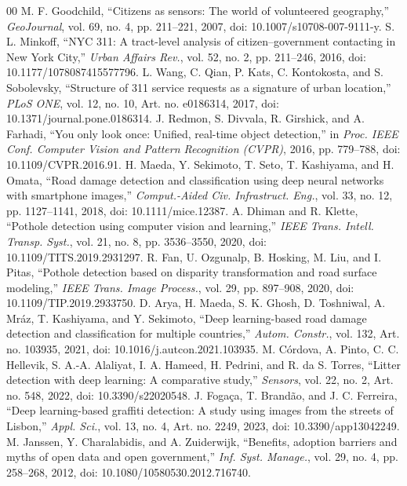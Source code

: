 \documentclass{ieeeaccess}
\begin{document}
\begin{thebibliography}{00}
 M. F. Goodchild, ``Citizens as sensors: The world of volunteered geography,'' \textit{GeoJournal}, vol. 69, no. 4, pp. 211--221, 2007, doi: 10.1007/s10708-007-9111-y.
 S. L. Minkoff, ``NYC 311: A tract-level analysis of citizen--government contacting in New York City,'' \textit{Urban Affairs Rev.}, vol. 52, no. 2, pp. 211--246, 2016, doi: 10.1177/1078087415577796.
 L. Wang, C. Qian, P. Kats, C. Kontokosta, and S. Sobolevsky, ``Structure of 311 service requests as a signature of urban location,'' \textit{PLoS ONE}, vol. 12, no. 10, Art. no. e0186314, 2017, doi: 10.1371/journal.pone.0186314.
 J. Redmon, S. Divvala, R. Girshick, and A. Farhadi, ``You only look once: Unified, real-time object detection,'' in \textit{Proc. IEEE Conf. Computer Vision and Pattern Recognition (CVPR)}, 2016, pp. 779--788, doi: 10.1109/CVPR.2016.91.
 H. Maeda, Y. Sekimoto, T. Seto, T. Kashiyama, and H. Omata, ``Road damage detection and classification using deep neural networks with smartphone images,'' \textit{Comput.-Aided Civ. Infrastruct. Eng.}, vol. 33, no. 12, pp. 1127--1141, 2018, doi: 10.1111/mice.12387.
 A. Dhiman and R. Klette, ``Pothole detection using computer vision and learning,'' \textit{IEEE Trans. Intell. Transp. Syst.}, vol. 21, no. 8, pp. 3536--3550, 2020, doi: 10.1109/TITS.2019.2931297.
 R. Fan, U. Ozgunalp, B. Hosking, M. Liu, and I. Pitas, ``Pothole detection based on disparity transformation and road surface modeling,'' \textit{IEEE Trans. Image Process.}, vol. 29, pp. 897--908, 2020, doi: 10.1109/TIP.2019.2933750.
 D. Arya, H. Maeda, S. K. Ghosh, D. Toshniwal, A. Mráz, T. Kashiyama, and Y. Sekimoto, ``Deep learning-based road damage detection and classification for multiple countries,'' \textit{Autom. Constr.}, vol. 132, Art. no. 103935, 2021, doi: 10.1016/j.autcon.2021.103935.
 M. Córdova, A. Pinto, C. C. Hellevik, S. A.-A. Alaliyat, I. A. Hameed, H. Pedrini, and R. da S. Torres, ``Litter detection with deep learning: A comparative study,'' \textit{Sensors}, vol. 22, no. 2, Art. no. 548, 2022, doi: 10.3390/s22020548.
 J. Fogaça, T. Brandão, and J. C. Ferreira, ``Deep learning-based graffiti detection: A study using images from the streets of Lisbon,'' \textit{Appl. Sci.}, vol. 13, no. 4, Art. no. 2249, 2023, doi: 10.3390/app13042249.
 M. Janssen, Y. Charalabidis, and A. Zuiderwijk, ``Benefits, adoption barriers and myths of open data and open government,'' \textit{Inf. Syst. Manage.}, vol. 29, no. 4, pp. 258--268, 2012, doi: 10.1080/10580530.2012.716740.

\end{thebibliography}
\end{document}
